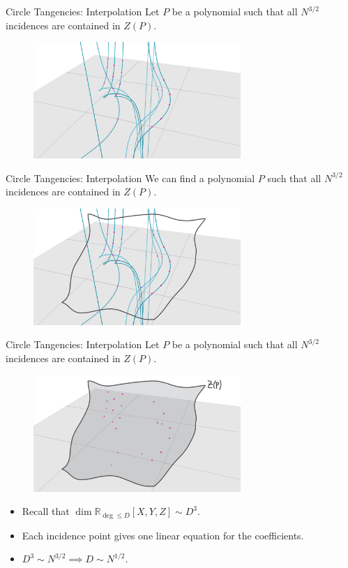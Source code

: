 \documentclass{beamer}
\newcommand{\RR}{\mathbb R}
\newcommand{\nfr}[1]{\begin{frame} #1
\end{frame}}
\begin{document}
\nfr{{Circle Tangencies: Interpolation}
Let $P$ be a polynomial such that all $N^{3/2}$ incidences are contained in $Z(P)$. 

\begin{figure}[h]
    \centering
    \includegraphics[width=0.7\textwidth]{images/lots_of_dots_a.png}
\end{figure}
}
\nfr{{Circle Tangencies: Interpolation}
We can find a polynomial $P$ such that all $N^{3/2}$ incidences are contained in $Z(P)$. 

\begin{figure}[h]
    \centering
    \includegraphics[width=0.7\textwidth]{images/lots_of_dots_b.png}
\end{figure}
}



\nfr{{Circle Tangencies: Interpolation}
Let $P$ be a polynomial such that all $N^{3/2}$ incidences are contained in $Z(P)$. 

\begin{figure}[h]
    \centering
    \includegraphics[width=0.7\textwidth]{images/lots_of_dots_c.png}
\end{figure} \pause
\begin{itemize}
    \item Recall that $\dim \RR_{\deg \leq D} [X,Y,Z] \sim D^3$. \pause
    \item Each incidence point gives one linear equation for the coefficients. \pause
    \item $D^3 \sim N^{3/2} \implies D \sim N^{1/2}$.
\end{itemize}

}
\end{document}
